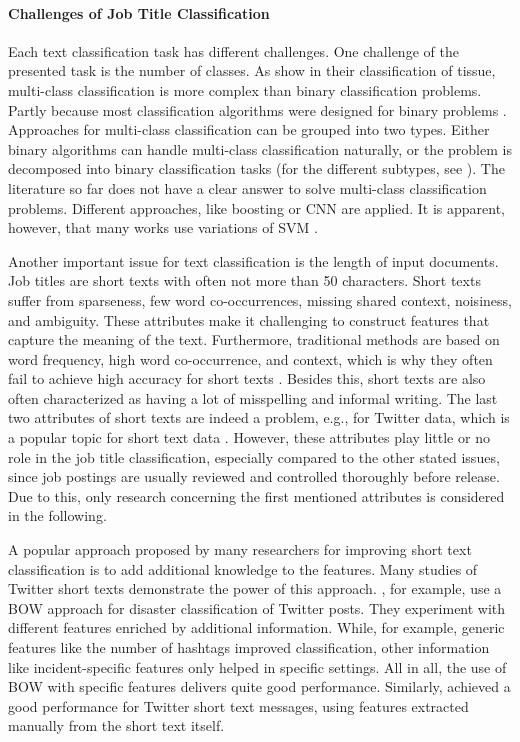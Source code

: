 \documentclass[12pt, a4paper, titlepage]{article}
\begin{document}
\paragraph{Challenges of Job Title Classification}
Each text classification task has different challenges. One challenge of the presented task is the number of classes. As \cite{li2004} show in their classification of tissue, multi-class classification is more complex than binary classification problems. Partly because most classification algorithms were designed for binary problems \citep{aly2005}. Approaches for multi-class classification can be grouped into two types. Either binary algorithms can handle multi-class classification naturally, or the problem is decomposed into binary classification tasks (for the different subtypes, see \cite{aly2005}). The literature so far does not have a clear answer to solve multi-class classification problems. Different approaches, like boosting \citep{schapire2000} or \ac{CNN} \citep{farooq2017} are applied. It is apparent, however, that many works use variations of SVM \citep{guo2015, tomar2015comparison, tang2019multi}.  

Another important issue for text classification is the length of input documents. Job titles are short texts with often not more than 50 characters. Short texts suffer from sparseness, few word co-occurrences, missing shared context, noisiness, and ambiguity. These attributes make it challenging to construct features that capture the meaning of the text. Furthermore, traditional methods are based on word frequency, high word co-occurrence, and context, which is why they often fail to achieve high accuracy for short texts \citep{Song2014, WangY2017, WangF2014,  alsmadi2019}. Besides this, short texts are also often characterized as having a lot of misspelling and informal writing. The last two attributes of short texts are indeed a problem, e.g., for Twitter data, which is a popular topic for short text data \citep{karimi2013, sriram2010, yan2018}. However, these attributes play little or no role in the job title classification, especially compared to the other stated issues, since job postings are usually reviewed and controlled thoroughly before release. Due to this, only research concerning the first mentioned attributes is considered in the following. 

A popular approach proposed by many researchers for improving short text classification is to add additional knowledge to the features. Many studies of Twitter short texts demonstrate the power of this approach. \citet{karimi2013}, for example, use a \ac{BOW} approach for disaster classification of Twitter posts. They experiment with different features enriched by additional information. While, for example, generic features like the number of hashtags improved classification, other information like incident-specific features only helped in specific settings. All in all, the use of \ac{BOW} with specific features delivers quite good performance. Similarly, \citet{sriram2010} achieved a good performance for Twitter short text messages, using features extracted manually from the short text itself.
\end{document}
